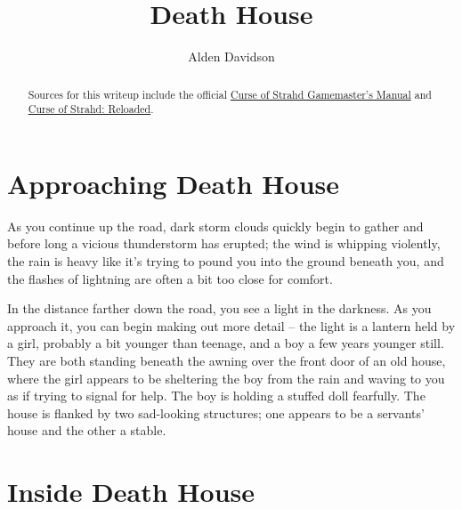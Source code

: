 \documentclass[a4paper,11pt]{article}
\title{Death House}
\author{Alden Davidson}
\begin{document}
\maketitle
\tableofcontents

\begin{abstract}
Sources for this writeup include the official \href{https://5e.tools/adventure.html#cos}{Curse of Strahd Gamemaster's Manual} and \href{https://www.reddit.com/r/CurseofStrahd/comments/9bpzbh/curse_of_strahd_reloaded_compilation_thread/}{Curse of Strahd: Reloaded}.
\end{abstract}

\pagebreak
\section*{Approaching Death House}
\label{sec:ApproachingDeathHouse}
\begin{readout}
As you continue up the road, dark storm clouds quickly begin to gather and before long a vicious thunderstorm has 
erupted; the wind is whipping violently, the rain is heavy like it's trying to pound you into the ground beneath 
you, and the flashes of lightning are often a bit too close for comfort.

In the distance farther down the road, you see a light in the darkness. As you approach it, you can begin making 
out more detail -- the light is a lantern held by a girl, probably a bit younger than teenage, and a boy a few 
years younger still. They are both standing beneath the awning over the front door of an old house, where the 
girl appears to be sheltering the boy from the rain and waving to you as if trying to signal for help.
The boy is holding a stuffed doll fearfully. The house is flanked by two sad-looking structures;
one appears to be a servants' house and the other a stable.
\end{readout}

\begin{arealinks}
  \item {}
\end{arealinks}


\pagebreak
\section*{Inside Death House}
\label{sec:InsideDeathHouse}








\end{document}
